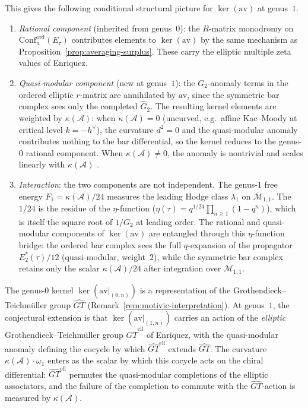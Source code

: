 \begin{remark}
This gives the following conditional structural picture for $\ker(\mathrm{av})$
at genus~$1$.

\begin{enumerate}[label=\textup{(\roman*)}]
\item \emph{Rational component} (inherited from genus~$0$):
 the $R$-matrix monodromy on $\mathrm{Conf}_n^{\mathrm{ord}}(E_\tau)$
 contributes elements to $\ker(\mathrm{av})$ by the same mechanism as
 Proposition~\ref{prop:averaging-surplus}. These carry the
 elliptic multiple zeta values of Enriquez.

\item \emph{Quasi-modular component} (new at genus~$1$):
 the $G_2$-anomaly terms in the ordered elliptic $r$-matrix are
 annihilated by $\mathrm{av}$, since the symmetric bar complex sees
 only the completed $\widehat{G}_2$. The resulting kernel elements
 are weighted by $\kappa(\mathcal{A})$: when $\kappa(\mathcal{A}) = 0$
 (uncurved, e.g.\ affine Kac--Moody at critical level $k = -h^\vee$),
 the curvature $d^2 = 0$ and the quasi-modular anomaly contributes
 nothing to the bar differential, so the kernel reduces to the
 genus-$0$ rational component. When
 $\kappa(\mathcal{A}) \neq 0$, the anomaly is nontrivial and scales
 linearly with $\kappa(\mathcal{A})$ .

\item \emph{Interaction}: the two components are not independent.
 The genus-$1$ free energy
 $F_1 = \kappa(\mathcal{A})/24$ measures the leading Hodge class $\lambda_1$ on
 $\overline{\mathcal{M}}_{1,1}$. The $1/24$ is the
 residue of the $\eta$-function ($\eta(\tau) = q^{1/24}\prod_{n \geq 1}(1 - q^n)$),
 which is itself the square root of $1/G_2$ at leading order.
 The rational and quasi-modular components of $\ker(\mathrm{av})$ are
 entangled through this $\eta$-function bridge: the ordered bar complex
 sees the full $q$-expansion of the propagator $E_2^*(\tau)/12$
 (quasi-modular, weight~$2$), while the symmetric bar complex retains
 only the scalar $\kappa(\mathcal{A})/24$ after integration over
 $\overline{\mathcal{M}}_{1,1}$.
\end{enumerate}

\noindent
The genus-$0$ kernel $\ker(\mathrm{av}|_{(0,n)})$ is a representation of
the Grothendieck--Teichm\"uller group $\widehat{GT}$
(Remark~\ref{rem:motivic-interpretation}). At genus~$1$, the
conjectural extension is that $\ker(\mathrm{av}|_{(1,n)})$ carries an
action of the \emph{elliptic} Grothendieck--Teichm\"uller group
$\widehat{GT}^{\mathrm{ell}}$ of Enriquez, with the quasi-modular
anomaly defining the cocycle by which $\widehat{GT}^{\mathrm{ell}}$
extends $\widehat{GT}$. The curvature $\kappa(\mathcal{A})\cdot\omega_1$
enters as the scalar by which this cocycle acts on the chiral differential:
$\widehat{GT}^{\mathrm{ell}}$ permutes the quasi-modular completions
of the elliptic associators, and the failure of the completion to
commute with the $\widehat{GT}$-action is measured by
$\kappa(\mathcal{A})$.
\end{remark}


